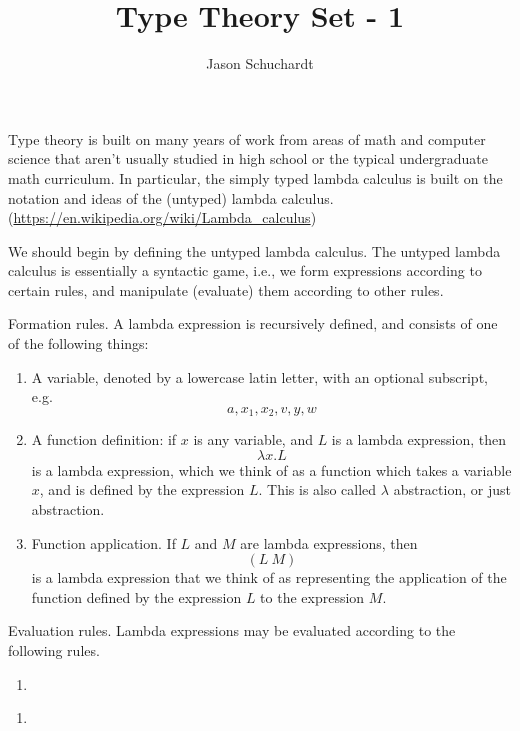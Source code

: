 \documentclass{article}
\title{Type Theory Set - 1}
\author{Jason Schuchardt}
\begin{document}
\maketitle

Type theory is built on many years of work from areas of math
and computer science
that aren't usually studied in high school or the typical
undergraduate math curriculum. In particular, the simply typed 
lambda calculus is built on the notation and ideas of the
(untyped) lambda calculus.
(\url{https://en.wikipedia.org/wiki/Lambda_calculus})

\begin{definition}
    We should begin by defining the untyped lambda calculus.
    The untyped lambda calculus is essentially a syntactic game,
    i.e., we form expressions according to certain rules,
    and manipulate (evaluate) them according to other rules.

    Formation rules. A lambda expression is recursively defined,
    and consists of one of the following things:
    \begin{enumerate}
        \item A variable, denoted by a lowercase latin letter,
            with an optional subscript, e.g.
            \[a,x_1,x_2,v,y,w\]
        \item A function definition: if $x$ is any variable, and $L$ is 
            a lambda expression, then 
            \[\lambda x.L\]
            is a lambda expression, which we think of as a
            function which takes a variable $x$, and is defined 
            by the expression $L$. This is also called 
            $\lambda$ abstraction, or just abstraction.
        \item Function application. If $L$ and $M$ are lambda
            expressions, then \[ (L\ M) \] is a lambda expression
            that we think of as representing the application
            of the function defined by the expression $L$ to 
            the expression $M$.
    \end{enumerate}

    Evaluation rules. Lambda expressions may be evaluated 
    according to the following rules.
    \begin{enumerate}
        \item 
    \end{enumerate}
\end{definition}

\begin{enumerate}[(1)]
    \item 
\end{enumerate}
\end{document}
